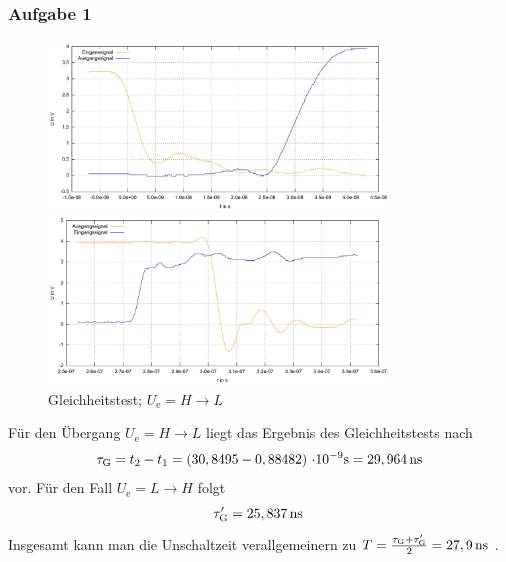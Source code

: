 \documentclass[numbers=noenddot,12pt,a4paper]{scrartcl}
\newcommand{\ix}[1]{_\text{#1}}
\begin{document}
\subsubsection{Aufgabe 1}
\begin{figure}[H]
\centering
\includegraphics[width=0.8\textwidth]{komb1.pdf}
\caption{Gleichheitstest; $U\ix{e}=H\rightarrow L$}
\includegraphics[width=0.8\textwidth]{komb2.pdf}
\end{figure}
Für den Übergang $U\ix{e}=H\rightarrow L$ liegt das Ergebnis des Gleichheitstests nach
\begin{align*}
 \tau\ix{G}=t_2-t_1=\unit[\left(30,8495-0,88482\right)]{\cdot 10^{-9}s}=\unit[29,964]{ns}
\end{align*}
vor. Für den Fall $U\ix{e}=L\rightarrow H$ folgt
\begin{align*}
\tau\ix{G}^{\prime}=\unit[25,837]{ns} \;
\end{align*}
Insgesamt kann man die Unschaltzeit verallgemeinern zu $T=\frac{\tau\ix{G}+\tau\ix{G}^{\prime}}{2}=\unit[27,9]{ns} \;$.
\end{document}

